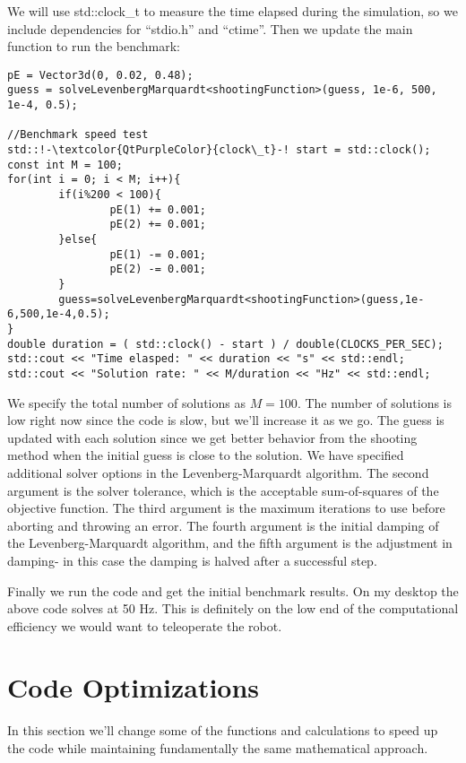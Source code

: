 \documentclass[12pt]{article}
\begin{document}
We will use std::clock\_t to measure the time elapsed during the simulation, so we include dependencies for ``stdio.h'' and ``ctime''. Then we update the main function to run the benchmark:
\begin{lstlisting}
pE = Vector3d(0, 0.02, 0.48);
guess = solveLevenbergMarquardt<shootingFunction>(guess, 1e-6, 500, 1e-4, 0.5);

//Benchmark speed test
std::!-\textcolor{QtPurpleColor}{clock\_t}-! start = std::clock();
const int M = 100;
for(int i = 0; i < M; i++){
		if(i%200 < 100){
				pE(1) += 0.001;
				pE(2) += 0.001;
		}else{
				pE(1) -= 0.001;
				pE(2) -= 0.001;
		}
		guess=solveLevenbergMarquardt<shootingFunction>(guess,1e-6,500,1e-4,0.5);
}
double duration = ( std::clock() - start ) / double(CLOCKS_PER_SEC);
std::cout << "Time elasped: " << duration << "s" << std::endl;
std::cout << "Solution rate: " << M/duration << "Hz" << std::endl;
\end{lstlisting}
We specify the total number of solutions as $M = 100$. The number of solutions is low right now since the code is slow, but we'll increase it as we go. The guess is updated with each solution since we get better behavior from the shooting method when the initial guess is close to the solution. We have specified additional solver options in the Levenberg-Marquardt algorithm. The second argument is the solver tolerance, which is the acceptable sum-of-squares of the objective function. The third argument is the maximum iterations to use before aborting and throwing an error. The fourth argument is the initial damping of the Levenberg-Marquardt algorithm, and the fifth argument is the adjustment in damping- in this case the damping is halved after a successful step.

Finally we run the code and get the initial benchmark results. On my desktop the above code solves at 50 Hz. This is definitely on the low end of the computational efficiency we would want to teleoperate the robot.

\section{Code Optimizations}

In this section we'll change some of the functions and calculations to speed up the code while maintaining fundamentally the same mathematical approach.
\end{document}
